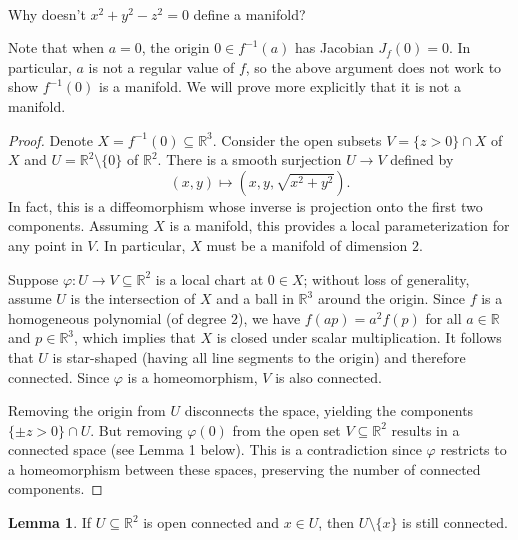 \documentclass[12pt]{article}
\newlength{\myparskip}
\newenvironment{fullbox}{\begin{lrbox}{\savefullbox}\begin{minipage}{\dimexpr\textwidth-2\fboxsep\relax}\setlength{\parskip}{\myparskip}}{\end{minipage}\end{lrbox}\framebox[\textwidth]{\usebox{\savefullbox}}}
\newenvironment{pbox}[1][]{\begin{fullbox}\ifx#1\empty\else\paragraph{#1}\phantom{}\fi}{\end{fullbox}}
\theoremstyle{definition}
\newtheorem{lemma}{Lemma}
\newcommand{\R}{\mathbb{R}}
\renewcommand{\phi}{\varphi}
\newcommand{\<}{\langle}
\renewcommand{\>}{\rangle}
\newcommand{\seq}{\subseteq}
\begin{document}
\begin{pbox}[]
    Why doesn't $x^2 + y^2 - z^2 = 0$ define a manifold?
\end{pbox}

Note that when $a = 0$, the origin $0 \in f^{-1}(a)$ has Jacobian $J_f(0) = 0$.
In particular, $a$ is not a regular value of $f$, so the above argument does not work to show $f^{-1}(0)$ is a manifold.
We will prove more explicitly that it is not a manifold.

\begin{proof}
    Denote $X = f^{-1}(0) \seq \R^3$.
    Consider the open subsets $V = \{z > 0\} \cap X$ of $X$ and $U = \R^2 \setminus\{0\}$ of $\R^2$.
    There is a smooth surjection $U \to V$ defined by
    \[
        (x, y) \longmapsto \left(x, y, \sqrt{x^2 + y^2}\right).
    \]
    In fact, this is a diffeomorphism whose inverse is projection onto the first two components.
    Assuming $X$ is a manifold, this provides a local parameterization for any point in $V$.
    In particular, $X$ must be a manifold of dimension $2$.

    Suppose $\phi : U \to V \seq \R^2$ is a local chart at $0 \in X$; without loss of generality, assume $U$ is the intersection of $X$ and a ball in $\R^3$ around the origin.
    Since $f$ is a homogeneous polynomial (of degree $2$), we have $f(ap) = a^2f(p)$ for all $a \in \R$ and $p \in \R^3$, which implies that $X$ is closed under scalar multiplication.
    It follows that $U$ is star-shaped (having all line segments to the origin) and therefore connected.
    Since $\phi$ is a homeomorphism, $V$ is also connected.
    
    Removing the origin from $U$ disconnects the space, yielding the components $\{\pm z > 0\} \cap U$.
    But removing $\phi(0)$ from the open set $V \seq \R^2$ results in a connected space (see Lemma 1 below).
    This is a contradiction since $\phi$ restricts to a homeomorphism between these spaces, preserving the number of connected components.
\end{proof}

\begin{lemma}
    If $U \seq \R^2$ is open connected and $x \in U$, then $U \setminus \{x\}$ is still connected.
\end{lemma}
\end{document}
